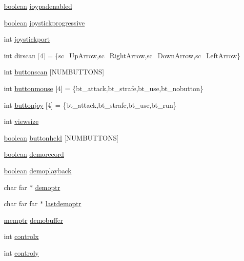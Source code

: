 \begin{DoxyCompactItemize}
\item 
\hyperlink{ID__HEAD_8H_a7c6368b321bd9acd0149b030bb8275ed}{boolean} \hyperlink{WL__PLAY_8C_ae95b411b2704beb68add5bf14c150af5}{joypadenabled}
\item 
\hyperlink{ID__HEAD_8H_a7c6368b321bd9acd0149b030bb8275ed}{boolean} \hyperlink{WL__PLAY_8C_aac8667efc78cc65ac4e1e8a5c45669aa}{joystickprogressive}
\item 
int \hyperlink{WL__PLAY_8C_a7756f30a454b3f333c7b6292fb73cc1c}{joystickport}
\item 
int \hyperlink{WL__PLAY_8C_ac9e7de0629d53e5cfa59e985910855c5}{dirscan} \mbox{[}4\mbox{]} = \{sc\_\-UpArrow,sc\_\-RightArrow,sc\_\-DownArrow,sc\_\-LeftArrow\}
\item 
int \hyperlink{WL__PLAY_8C_a1f33f8928f170492601ca03d06dcaed5}{buttonscan} \mbox{[}NUMBUTTONS\mbox{]}
\item 
int \hyperlink{WL__PLAY_8C_aba18dce29b201b4aa0f95ac4b26a230d}{buttonmouse} \mbox{[}4\mbox{]} = \{bt\_\-attack,bt\_\-strafe,bt\_\-use,bt\_\-nobutton\}
\item 
int \hyperlink{WL__PLAY_8C_a7d53efcab80b501943d05e6f82ca1b61}{buttonjoy} \mbox{[}4\mbox{]} = \{bt\_\-attack,bt\_\-strafe,bt\_\-use,bt\_\-run\}
\item 
int \hyperlink{WL__PLAY_8C_a600cf8c414283a1b5615342c73605284}{viewsize}
\item 
\hyperlink{ID__HEAD_8H_a7c6368b321bd9acd0149b030bb8275ed}{boolean} \hyperlink{WL__PLAY_8C_a0c7b9b3b7a3c5a984902f52507d194ab}{buttonheld} \mbox{[}NUMBUTTONS\mbox{]}
\item 
\hyperlink{ID__HEAD_8H_a7c6368b321bd9acd0149b030bb8275ed}{boolean} \hyperlink{WL__PLAY_8C_a29ad9ab3cdb052a60b70348e9de1c33e}{demorecord}
\item 
\hyperlink{ID__HEAD_8H_a7c6368b321bd9acd0149b030bb8275ed}{boolean} \hyperlink{WL__PLAY_8C_a49497ef447e431d2e365f96d1fd6f2a8}{demoplayback}
\item 
char far $\ast$ \hyperlink{WL__PLAY_8C_aacc691a23998ed80395749868f5124e9}{demoptr}
\item 
char far far $\ast$ \hyperlink{WL__PLAY_8C_ac5eb2656741bc6d98c3337122048bf45}{lastdemoptr}
\item 
\hyperlink{ID__MM_8H_a04062decc7eb282b066c65e9137bb9bf}{memptr} \hyperlink{WL__PLAY_8C_a1ecc350196af0f2d39e17d758ee66ba3}{demobuffer}
\item 
int \hyperlink{WL__PLAY_8C_a6343ac6ef7aa896e23ee621de5be7389}{controlx}
\item 
int \hyperlink{WL__PLAY_8C_abf431ed8fcd1eb83dbfebb06f325efcc}{controly}

\end{DoxyCompactItemize}
